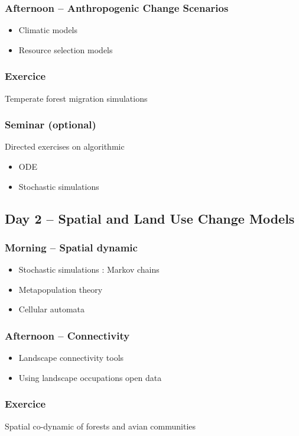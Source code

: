 \documentclass[12]{article}
\begin{document}
  \subsubsection*{Afternoon -- Anthropogenic Change Scenarios}
  \begin{itemize}
    \item Climatic models
    \item Resource selection models
  \end{itemize}
  \subsubsection*{Exercice}
  Temperate forest migration simulations

  \subsubsection*{Seminar (optional)}
  Directed exercises on algorithmic
  \begin{itemize}
    \item ODE
    \item Stochastic simulations
  \end{itemize}

  \subsection*{Day 2 -- Spatial and Land Use Change Models}
  \subsubsection*{Morning -- Spatial dynamic}
  \begin{itemize}
    \item Stochastic simulations : Markov chains
    \item Metapopulation theory
    \item Cellular automata
  \end{itemize}

  \subsubsection*{Afternoon -- Connectivity}
  \begin{itemize}
    \item Landscape connectivity tools
    \item Using landscape occupations open data
  \end{itemize}
  \subsubsection*{Exercice}
  Spatial co-dynamic of forests and avian communities
\end{document}
